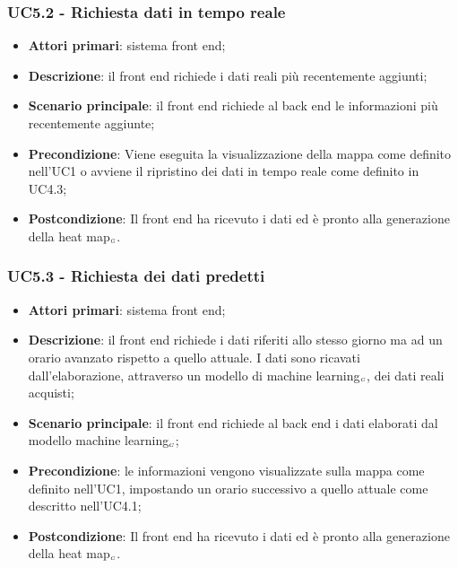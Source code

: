 \subsubsection{UC5.2 - Richiesta dati in tempo reale}
\begin{itemize}
	\item \textbf{Attori primari}: sistema front end;
	\item \textbf{Descrizione}: il front end richiede i dati reali più recentemente aggiunti;
	\item \textbf{Scenario principale}: il front end richiede al back end le informazioni più recentemente aggiunte;
	\item \textbf{Precondizione}: Viene eseguita la visualizzazione della mappa come definito nell’UC1 o avviene il ripristino dei dati in tempo reale come definito in UC4.3;
	\item \textbf{Postcondizione}: Il front end ha ricevuto i dati ed è pronto alla generazione della heat map$_{\scaleto{G}{3pt}}$. 
\end{itemize}

\subsubsection{UC5.3 - Richiesta dei dati predetti}
\begin{itemize}
	\item \textbf{Attori primari}: sistema front end;
	\item \textbf{Descrizione}: il front end richiede i dati riferiti allo stesso giorno ma ad un orario avanzato rispetto a quello attuale.
	I dati sono ricavati dall’elaborazione, attraverso un modello di machine learning$_{\scaleto{G}{3pt}}$, dei dati reali acquisti;
	\item \textbf{Scenario principale}: il front end richiede al back end i dati elaborati dal modello machine learning$_{\scaleto{G}{3pt}}$;
	\item \textbf{Precondizione}: le informazioni vengono visualizzate sulla mappa come definito nell’UC1, impostando un orario successivo a quello attuale come descritto nell’UC4.1;
	\item \textbf{Postcondizione}: Il front end ha ricevuto i dati ed è pronto alla generazione della heat map$_{\scaleto{G}{3pt}}$. 
\end{itemize}


